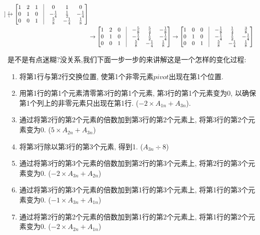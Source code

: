 \begin{align*}
\begin{bmatrix}
  \end{bmatrix}
  \rightarrow
  \begin{bmatrix}
    1 & 2 & 1 & \vline & 0 & 1 & 0 \\
    0 & 1 & 0 & \vline & -\frac{1}{4} & \frac{1}{2} & -\frac{1}{4} \\
    0 & 0 & 1 & \vline & \frac{5}{8} & -\frac{1}{4} & \frac{1}{8} \\
  \end{bmatrix} \\
& \rightarrow
  \begin{bmatrix}
    1 & 2 & 0 & \vline & -\frac{5}{8} & \frac{5}{4} & -\frac{1}{8} \\
    0 & 1 & 0 & \vline & -\frac{1}{4} & \frac{1}{2} & -\frac{1}{4} \\
    0 & 0 & 1 & \vline & \frac{5}{8} & -\frac{1}{4} & \frac{1}{8} \\
  \end{bmatrix}
  \rightarrow
  \begin{bmatrix}
    1 & 0 & 0 & \vline & -\frac{1}{8} & \frac{1}{4} & \frac{3}{8} \\
    0 & 1 & 0 & \vline & -\frac{1}{4} & \frac{1}{2} & -\frac{1}{4} \\
    0 & 0 & 1 & \vline & \frac{5}{8} & -\frac{1}{4} & \frac{1}{8} \\
  \end{bmatrix}
\end{align*}

是不是有点迷糊?没关系,我们下面一步一步的来讲解这是一个怎样的变化过程:

\begin{enumerate}
  \item 将第1行与第2行交换位置, 使第1个非零元素$\mathord{pivot}$出现在第1个位置. 
  \item 用第1行的第1个元素清零第3行的第1个元素, 第3行的第1个元素变为0, 以确保第1个列上的非零元素只出现在第1行. ($-2 \times A_{1n} + A_{3n}$).
  \item 通过将第2行的第2个元素的倍数加到第3行的第2个元素上, 将第3行的第2个元素变为0. ($5 \times A_{2n} + A_{3n}$)
  \item 将第3行除以第3行的第3个元素, 得到1. ($A_{3n} \div 8$)
  \item 通过将第3行的第3个元素的倍数加到第2行的第3个元素上, 将第2行的第3个元素变为0. ($-2 \times A_{3n} + A_{2n}$)
  \item 通过将第3行的第3个元素的倍数加到第1行的第3个元素上, 将第1行的第3个元素变为0. ($ -1 \times A_{3n} + A_{1n}$)
  \item 通过将第2行的第2个元素的倍数加到第1行的第2个元素上, 将第1行的第2个元素变为0. ($ -2 \times A_{2n} + A_{1n}$)
\end{enumerate}

